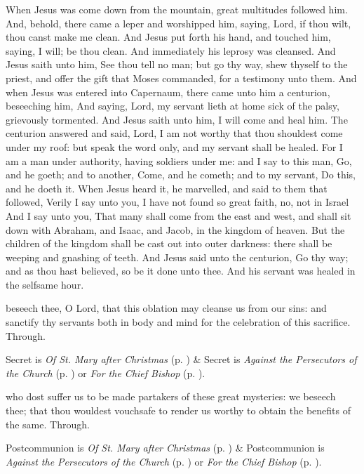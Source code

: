  When Jesus was come down from the mountain, great multitudes followed him. And, behold, there came a leper and worshipped him, saying, Lord, if thou wilt, thou canst make me clean. And Jesus put forth his hand, and touched him, saying, I will; be thou clean. And immediately his leprosy was cleansed. And Jesus saith unto him, See thou tell no man; but go thy way, shew thyself to the priest, and offer the gift that Moses commanded, for a testimony unto them. And when Jesus was entered into Capernaum, there came unto him a centurion, beseeching him, And saying, Lord, my servant lieth at home sick of the palsy, grievously tormented. And Jesus saith unto him, I will come and heal him. The centurion answered and said, Lord, I am not worthy that thou shouldest come under my roof: but speak the word only, and my servant shall be healed. For I am a man under authority, having soldiers under me: and I say to this man, Go, and he goeth; and to another, Come, and he cometh; and to my servant, Do this, and he doeth it. When Jesus heard it, he marvelled, and said to them that followed, Verily I say unto you, I have not found so great faith, no, not in Israel And I say unto you, That many shall come from the east and west, and shall sit down with Abraham, and Isaac, and Jacob, in the kingdom of heaven. But the children of the kingdom shall be cast out into outer darkness: there shall be weeping and gnashing of teeth. And Jesus said unto the centurion, Go thy way; and as thou hast believed, so be it done unto thee. And his servant was healed in the selfsame hour.

\secret
{} beseech thee, O Lord, that this oblation may cleanse us from our sins: and sanctify thy servants both in body and mind for the celebration of this sacrifice. Through.
\begin{rubric}
     Secret is \emph{Of St. Mary after Christmas} (p. \pageref{SPMaryPostChristmas}) \&  Secret is \emph{Against the Persecutors of the Church} (p. \pageref{SPAgainst}) or \emph{For the Chief Bishop} (p. \pageref{SPChiefBishop}).
\end{rubric}
\postcommunion
{} who dost suffer us to be made partakers of these great mysteries: we beseech thee; that thou wouldest vouchsafe to render us worthy to obtain the benefits of the same. Through.
\begin{rubric}
     Postcommunion is \emph{Of St. Mary after Christmas} (p. \pageref{SPMaryPostChristmas}) \&  Postcommunion is \emph{Against the Persecutors of the Church} (p. \pageref{SPAgainst}) or \emph{For the Chief Bishop} (p. \pageref{SPChiefBishop}).
\end{rubric}


